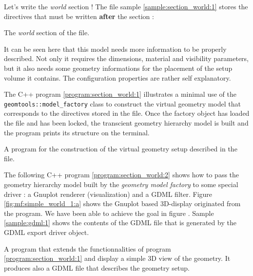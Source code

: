 \pn  Let's   write  the  \emph{world}   section  !  The   file  sample
\ref{sample:section_world:1}  stores  the   directives  that  must  be
written \textbf{after} the  section :
\begin{sample}
\caption{The \emph{world}
  section of the   file.}
\label{sample:section_world:1}
\end{sample}

\pn It can  be seen here that this model needs  more information to be
properly described.  Not only it requires the dimensions, material and
visibility parameters,  but it  also needs some  geometry informations
for the placement  of the setup volume it  contains. The configuration
properties are rather self explanatory.

\pn  The  C++   program  \ref{program:section_world:1}  illustrates  a
minimal  use   of  the  \texttt{geomtools::model\_factory}   class  to
construct  the   virtual  geometry  model  that   corresponds  to  the
directives  stored in the   file.   Once the
factory object has loaded the file and has been locked, the transcient
geometry hierarchy model is built and the program prints its structure
on the terminal.
  

\begin{program}[h]
\caption{A program for the  construction of the virtual geometry setup
  described in the  file.}
\label{program:section_world:1}
\end{program}


\pn The following  C++ program \ref{program:section_world:2} shows how
to pass the geometry hierarchy model built by the \emph{geometry model
  factory} to some special driver : a Gnuplot renderer (visualization)
and  a GDML  filter.  Figure  \ref{fig:mf:simple_world_1:a}  shows the
Gnuplot  based 3D-display originated  from the  program. We  have been
able  to   achieve  the   goal  in  figure   \label{fig:mf:0}.  Sample
\ref{sample:gdml:1}  shows  the contents  of  the  GDML  file that  is
generated by the GDML export driver object.


\begin{program}[hp]
\caption{A  program  that  extends  the  functionnalities  of  program
  \ref{program:section_world:1} and  display a  simple 3D view  of the
  geometry. It produces  also a GDML file that  describes the geometry
  setup.}
\label{program:section_world:2}
\end{program}

